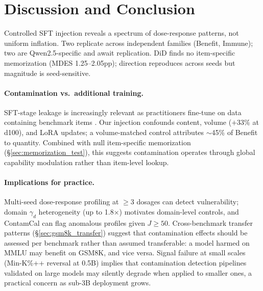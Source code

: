 \section{Discussion and Conclusion}\label{sec:conclusion}

Controlled SFT injection reveals a spectrum of dose-response patterns, not uniform inflation. Two replicate across independent families (Benefit, Immune); two are Qwen2.5-specific and await replication. DiD finds no item-specific memorization (MDES 1.25--2.05pp); direction reproduces across seeds but magnitude is seed-sensitive.

\paragraph{Contamination vs.\ additional training.}
SFT-stage leakage is increasingly relevant as practitioners fine-tune on data containing benchmark items \citep{balloccu2024leak}. Our injection confounds content, volume ($+$33\% at d100), and LoRA updates; a volume-matched control attributes ${\sim}$45\% of Benefit to quantity. Combined with null item-specific memorization (\S\ref{sec:memorization_test}), this suggests contamination operates through global capability modulation rather than item-level lookup.

\paragraph{Implications for practice.}
Multi-seed dose-response profiling at $\geq$3 dosages can detect vulnerability; domain $\gamma_d$ heterogeneity (up to 1.8$\times$) motivates domain-level controls, and ContamCal can flag anomalous profiles given $J \geq 50$. Cross-benchmark transfer patterns (\S\ref{sec:gsm8k_transfer}) suggest that contamination effects should be assessed per benchmark rather than assumed transferable: a model harmed on MMLU may benefit on GSM8K, and vice versa. Signal failure at small scales (Min-K\%++ reversal at 0.5B) implies that contamination detection pipelines validated on large models may silently degrade when applied to smaller ones, a practical concern as sub-3B deployment grows.

